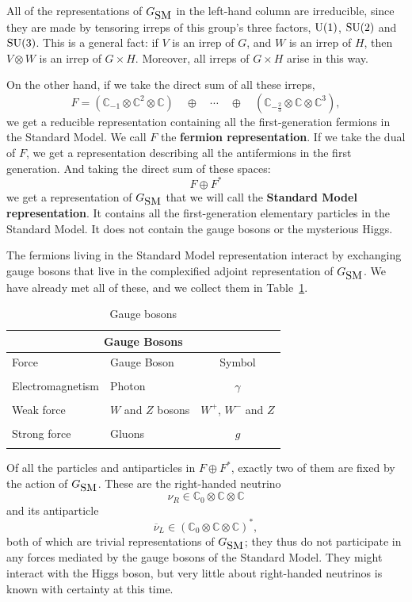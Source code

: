 \documentclass{article}
\newcommand{\C}{{\mathbb C}}  %
\newcommand{\U}{{\rm U}}    %
\newcommand{\SU}{{\rm SU}}    %
\newcommand{\twothirds}{\frac{2}{3}} %
\newcommand{\GSM}{{G_{\mbox{\rm SM}}}}  %
\newcommand{\nubar}{\overline{\nu}} %
\begin{document}
\noindent
All of the representations of $\GSM$ in the left-hand column are irreducible,
since they are made by tensoring irreps of this group's three factors,
$\U(1)$, $\SU(2)$ and $\SU(3)$.  This is a general
fact: if $V$ is an irrep of $G$, and $W$ is an irrep of $H$, then $V \otimes W$
is an irrep of $G \times H$. Moreover, all irreps of $G \times H$ arise in this
way.

On the other hand, if we take the direct sum of all these irreps,
\[ F = (\C_{-1} \otimes \C^2 \otimes \C) \quad \oplus \quad \cdots \quad 
\oplus \quad (\C_{-\twothirds} \otimes \C \otimes \C^3), \]
we get a reducible representation containing all the first-generation fermions
in the Standard Model.  We call $F$ the {\bf fermion representation}.
If we take the dual of $F$, we get a representation describing all the 
antifermions in the first generation.  And taking the direct sum of these
spaces:
\[ F \oplus F^* \]
we get a representation of $\GSM$ that we will call the \textbf{Standard Model
representation}. It contains all the first-generation elementary particles in
the Standard Model. It does not contain the gauge bosons or the mysterious
Higgs. 

The fermions living in the Standard Model representation interact by exchanging
gauge bosons that live in the complexified adjoint representation of $\GSM$. We
have already met all of these, and we collect them in
Table~\ref{tab:gaugebosons}.

\begin{table}[H]
\begin{center}
	\begin{tabular}{llc}
		\hline
		\multicolumn{3}{|c|}{\bf{Gauge Bosons}} \\
		\hline
		Force & Gauge Boson & Symbol \\
		\hline
                \\ 
		Electromagnetism & Photon & $\gamma$ \\
		\\
		Weak force & $W$ and $Z$ bosons & $W^+$, $W^-$ and $Z$ \\
		\\
		Strong force & Gluons & $g$ \\  \\
		\hline 
	\end{tabular}
	\caption{Gauge bosons} \label{tab:gaugebosons}
\end{center}
\end{table}

Of all the particles and antiparticles in $F \oplus F^*$, exactly two of
them are fixed by the action of $\GSM$. These are the right-handed neutrino
\[ \nu_R \in \C_0 \otimes \C \otimes \C \]
and its antiparticle
\[ \nubar_L \in (\C_0 \otimes \C \otimes \C)^*, \]
both of which are trivial representations of $\GSM$; they thus do not
participate in any forces mediated by the gauge bosons of the Standard
Model. They might interact with the Higgs boson, but very little about
right-handed neutrinos is known with certainty at this time.
\end{document}
